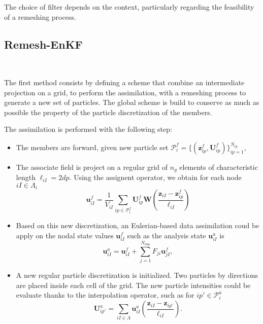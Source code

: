 The choice of filter depends on the context, particularly regarding the feasibility of a remeshing process.

\subsection{Remesh-EnKF}~\label{remesh_enkf}

The first method consists by defining a scheme that combine an intermediate projection on a grid, to perform the assimilation, with a remeshing process to generate a new set of particles. The global scheme is build to conserve as much as possible the property of the particle discretization of the members.

The assimilation is performed with the following step:
\begin{itemize}
    \item The members are forward, given new particle set $\mathcal{P}^f_i = \{(\bm z^f_{ip}, \bm U^f_{ip})\}_{ip = 1}^{N_{ip}}$,
    \item The associate field is project on a regular grid of $n_g$ elements of characteristic length $\ell_{iI}= 2dp$. Using the assignent operator, we obtain for each node $iI \in \Lambda_{i}$
          \begin{equation*}
              \bm{u}^f_{iI} = \frac1{V_{iI}} \sum_{ip \in \mathcal P^f_i} \bm U^f_{ip}  \bm W \left(\frac{\bm z_{iI} - \bm z^f_{ip}}{\ell_{iI}} \right)
          \end{equation*}
    \item Based on this new discretization, an Eulerian-based data assimilation coud be apply on the nodal state values $ \bm{u}^f_{iI}$ such as the analysis state $\bm{u}_{iI}^a$ is
          \begin{equation*}
              \bm{u}^a_{iI} = \bm{u}^f_{iI} + \sum_{j=1}^{N_{\text{ens}}} F_{ji} \bm{u}^f_{jI},
          \end{equation*}
    \item A new regular particle discretization is initialized. Two particles by directions are placed inside each cell of the grid. The new particle intensities could be evaluate thanks to the interpolation operator, such as for $ip' \in \mathcal P_i^a$
          \begin{equation*}
              \bm U_{ip'}^a = \sum_{iI \in \Lambda} \bm u^a_{iI} \left(\frac{\bm z_{iI} - \bm z_{ip'}}{\ell_{iI}} \right).
          \end{equation*}
\end{itemize}

